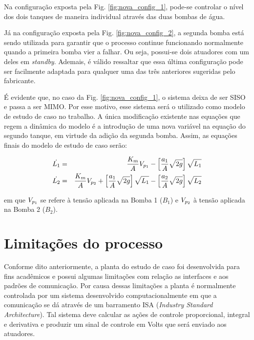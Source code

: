Na configuração exposta pela Fig. \ref{fig:nova_config_1}, pode-se controlar o
nível dos dois tanques de maneira individual através das duas bombas de água.

Já na configuração exposta pela Fig. \ref{fig:nova_config_2}, a segunda bomba
está sendo utilizada para garantir que o processo continue funcionando
normalmente quando a primeira bomba vier a falhar. Ou seja, possui-se dois
atuadores com um deles em {\it standby}. Ademais, é válido ressaltar que essa
última configuração pode ser facilmente adaptada para qualquer uma das três
anteriores sugeridas pelo fabricante.

É evidente que, no caso da Fig. \ref{fig:nova_config_1}, o sistema deixa de ser
SISO e passa a ser MIMO. Por esse motivo, esse sistema será o utilizado como
modelo de estudo de caso no trabalho. A única modificação existente nas equações
que regem a dinâmica do modelo é a introdução de uma nova variável na equação do
segundo tanque, em virtude da adição da segunda bomba. Assim, as equações finais
do modelo de estudo de caso serão:

\begin{eqnarray}
\dot{L_1} & = & \frac{K_m}{A}V_{p_{\tiny 1}} -
                \left[\frac{a_1}{A}\sqrt{2g}\right]\sqrt{L_1}
                \label{eq:l1_ponto}\\
\dot{L_2} & = & \frac{K_m}{A}V_{p_{\tiny 2}} +
                \left[\frac{a_1}{A}\sqrt{2g}\right]\sqrt{L_1} -
                \left[\frac{a_2}{A}\sqrt{2g}\right]\sqrt{L_2}
                \label{eq:l2_ponto}
\end{eqnarray}

\noindent em que $V_{p_{\tiny 1}}$ se refere à tensão aplicada na Bomba 1
($B_1$) e $V_{p_{\tiny 2}}$ à tensão aplicada na Bomba 2 ($B_2$).


\section{Limitações do processo}\label{sec:limitacoes}
Conforme dito anteriormente, a planta do estudo de caso foi desenvolvida para
fins acadêmicos e possui algumas limitações com relação as interfaces e aos
padrões de comunicação. Por causa dessas limitações a planta é normalmente
controlada por um sistema desenvolvido computacionalmente em que a comunicação
se dá através de um barramento ISA ({\it Industry Standard Architecture}). Tal
sistema deve calcular as ações de controle proporcional, integral e derivativa e
produzir um sinal de controle em Volts que será enviado aos atuadores.

